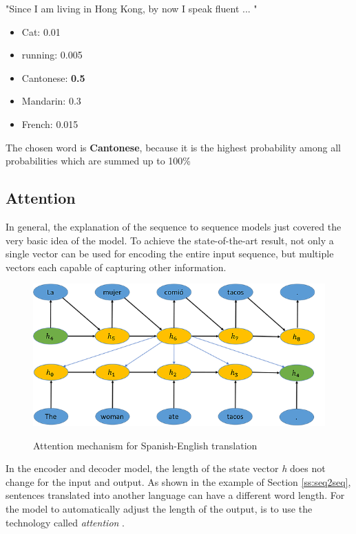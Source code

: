 \begin{tcolorbox}
	"Since I am living in Hong Kong, by now I speak fluent ... "
	
	\begin{itemize}
		\item Cat: 0.01
		\item running: 0.005
		\item Cantonese: \textbf{0.5}
		\item Mandarin: 0.3
		\item French: 0.015
	\end{itemize}

	The chosen word is \textbf{Cantonese}, because it is the highest probability among all probabilities which are summed up to 100\%
\end{tcolorbox}
 

\subsection{Attention}
In general, the explanation of the sequence to sequence models just covered the very basic idea of the model. To achieve the state-of-the-art result, not only a single vector can be used for encoding the entire input sequence, but multiple vectors each capable of capturing other information. 

\begin{figure}
	\begin{center}
		\includegraphics[width=4.5in]{photos/w1-11}\\
		\caption{Attention mechanism for Spanish-English translation \cite{mugan}}\label{attention1}
	\end{center}
\end{figure}
In the encoder and decoder model, the length of the state vector \textit{h} does not change for the input and output. As shown in the example of Section \ref{ss:seq2seq}, sentences translated into another language can have a different word length. For the model to automatically adjust the length of the output, is to use the technology called \textit{attention} \cite{attention} \cite{attention2}.

